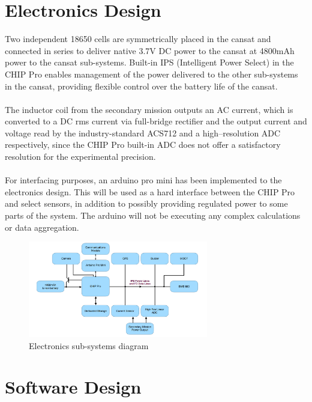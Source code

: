 \documentclass{report}
\begin{document}
	\section{Electronics Design}
		Two independent 18650 cells are symmetrically placed in the cansat and
		connected in series to deliver native 3.7V DC power to the cansat at 
		4800mAh power to the cansat sub-systems.
		Built-in IPS (Intelligent Power Select) in the CHIP Pro enables management
		of the power delivered to the other sub-systems in the cansat, providing
		flexible control over the battery life of the cansat. 
		\\\\
		The inductor coil from the secondary mission outputs an AC current, which
		is converted to a DC rms current via full-bridge rectifier and the output
		current and voltage read by the industry-standard ACS712 and a 
		high--resolution ADC respectively, since the CHIP Pro built-in ADC 
		does not offer a satisfactory resolution for the experimental precision.
		\\\\
		{\color{blue}For interfacing purposes, an arduino pro mini has been
		implemented to the electronics design. This will be used as a hard interface
		between the CHIP Pro and select sensors, in addition to possibly providing
		regulated power to some parts of the system. The arduino will not be 
		executing any complex calculations or data aggregation.}
		
		\begin{figure}[H]
			\begin{center}
				\includegraphics[width=0.7\textwidth]{electronics}
			\end{center}
			\vspace{-15pt}
			\caption{Electronics sub-systems diagram}
		\end{figure}


	\section{Software Design}
\end{document}
